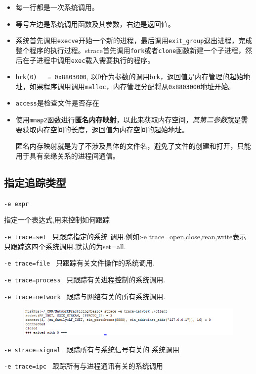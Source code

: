 \documentclass[UTF8,a4paper,8pt]{ctexbook}
\begin{document}
		\begin{itemize}
			\item 每一行都是一次系统调用。
			\item 等号左边是系统调用函数及其参数，右边是返回值。
			\item 系统首先调用\verb|execve|开始一个新的进程，最后调用\verb|exit_group|退出进程，完成整个程序的执行过程。strace首先调用\verb|fork|或者\verb|clone|函数新建一个子进程，然后在子进程中调用\verb|exec|载入需要执行的程序。
			\item \verb|brk(0)   = 0x8803000|, 以0作为参数的调用\verb|brk|，返回值是内存管理的起始地址，如果程序调用调用\verb|malloc|，内存管理分配将从\verb|0x8803000|地址开始。
			\item \verb|access|是检查文件是否存在
			\item 使用\verb|mmap2|函数进行\textbf{匿名内存映射}，以此来获取内存空间，\textit{其第二参数}就是需要获取内存空间的长度，返回值为内存空间的起始地址。
			
			匿名内存映射就是为了不涉及具体的文件名，避免了文件的创建和打开，只能用于具有亲缘关系的进程间通信。
		\end{itemize}
		
		\subsection{指定追踪类型}
			\verb|-e expr|
			
			指定一个表达式,用来控制如何跟踪
			
			\verb|-e trace=set |
			只跟踪指定的系统 调用.例如:-e trace=open,close,rean,write表示只跟踪这四个系统调用.默认的为set=all. 
			
			\verb|-e trace=file |
			只跟踪有关文件操作的系统调用. 
			
			\verb|-e trace=process |
			只跟踪有关进程控制的系统调用. 
			
			\verb|-e trace=network |
			跟踪与网络有关的所有系统调用. 
				\begin{figure}[h]
					\centering
					\includegraphics[scale = 0.6]{strace-Net.png}
				\end{figure}
				
			\verb|-e strace=signal |
			跟踪所有与系统信号有关的 系统调用 
			
			\verb|-e trace=ipc |
			跟踪所有与进程通讯有关的系统调用 
		
\end{document}
